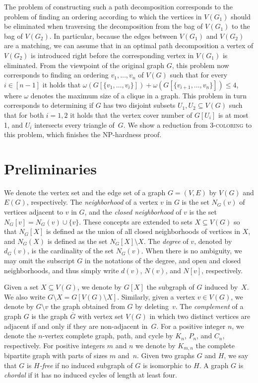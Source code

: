 \documentclass[11pt]{article}
\theoremstyle{definition}
\newcommand{\NP}{\textup{\textsf{NP}}}
\begin{document}
The problem of constructing such a path decomposition corresponds to the problem of finding an ordering according to which the vertices in $V(G_1)$ should be eliminated when traversing the decomposition from the bag of $V(G_1)$ to the bag of $V(G_2)$.
In particular, because the edges between $V(G_1)$ and $V(G_2)$ are a matching, we can assume that in an optimal path decomposition a vertex of $V(G_2)$ is introduced right before the corresponding vertex in $V(G_1)$ is eliminated.
From the viewpoint of the original graph $G$, this problem now corresponds to finding an ordering $v_1, \ldots, v_n$ of $V(G)$ such that for every $i \in [n-1]$ it holds that $\omega(G[\{v_1, \ldots, v_i\}]) + \omega(G[\{v_{i+1}, \ldots, v_n\}]) \le 4$, where $\omega$ denotes the maximum size of a clique in a graph.
This problem in turn corresponds to determining if $G$ has two disjoint subsets $U_1,U_2 \subseteq V(G)$ such that for both $i = 1,2$ it holds that the vertex cover number of $G[U_i]$ is at most 1, and $U_i$ intersects every triangle of~$G$.
We show a reduction from \textsc{3-coloring} to this problem, which finishes the \NP-hardness proof.


\section{Preliminaries}\label{sec:preliminaries}

We denote the vertex set and the edge set of a graph $G = (V,E)$ by $V(G)$ and $E(G)$, respectively.
The \emph{neighborhood} of a vertex $v$ in $G$ is the set $N_G(v)$ of vertices adjacent to $v$ in $G$, and the \emph{closed neighborhood} of $v$ is the set $N_G[v] = N_G(v) \cup \{v\}$.
These concepts are extended to sets $X\subseteq V(G)$ so that $N_G[X]$ is defined as the union of all closed neighborhoods of vertices in $X$, and $N_G(X)$ is defined as the set $N_G[X]\setminus X$.
The \emph{degree} of $v$, denoted by $d_G(v)$, is the cardinality of the set $N_G(v)$.
When there is no ambiguity, we may omit the subscript $G$ in the notations of the degree, and open and closed neighborhoods, and thus simply write $d(v)$, $N(v)$, and $N[v]$, respectively.

Given a set $X \subseteq V(G)$, we denote by $G[X]$ the subgraph of $G$ induced by~$X$.
We also write $G \setminus X = G[V(G) \setminus X]$.
Similarly, given a vertex $v \in V(G)$, we denote by $G \setminus v$ the graph obtained from $G$ by deleting~$v$.
The \emph{complement} of a graph $G$ is the graph $\overline{G}$ with vertex set $V(G)$ in which two distinct vertices are adjacent if and only if they are non-adjacent in~$G$.
For a positive integer $n$, we denote the $n$-vertex complete graph, path, and cycle by $K_n$, $P_n$, and $C_n$, respectively.
For positive integers $m$ and $n$ we denote by $K_{m,n}$ the complete bipartite graph with parts of sizes $m$ and~$n$.
Given two graphs $G$ and $H$, we say that $G$ is \emph{$H$-free} if no induced subgraph of $G$ is isomorphic to $H$.
A graph $G$ is \emph{chordal} if it has no induced cycles of length at least four.
\end{document}
